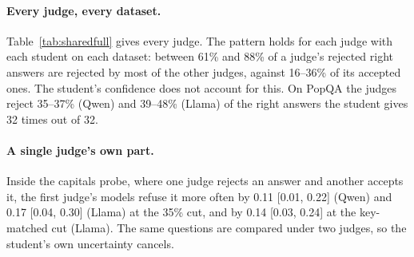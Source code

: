 \begin{table}[t]
\small
\centering
\setlength{\tabcolsep}{3.6pt}
\caption{Each judge at the 35\% cut on the right answers of the untrained student (training questions). \emph{Rej.}: share of right answers the judge rejects. \emph{Shared}: share of its rejections, and of its acceptances, that at least two of the other three judges also reject. \emph{AUC}: how well another judge's score (mean over the other three) and the student's confidence (agreement among its 32 samples) predict the judge's verdict.}
\label{tab:sharedfull}
\end{table}

\paragraph{Every judge, every dataset.} Table~\ref{tab:sharedfull} gives every judge. The pattern holds for each judge with each student on each dataset: between 61\% and 88\% of a judge's rejected right answers are rejected by most of the other judges, against 16--36\% of its accepted ones. The student's confidence does not account for this. On PopQA the judges reject 35--37\% (Qwen) and 39--48\% (Llama) of the right answers the student gives 32 times out of 32.

\paragraph{A single judge's own part.} Inside the capitals probe, where one judge rejects an answer and another accepts it, the first judge's models refuse it more often by 0.11 [0.01, 0.22] (Qwen) and 0.17 [0.04, 0.30] (Llama) at the 35\% cut, and by 0.14 [0.03, 0.24] at the key-matched cut (Llama). The same questions are compared under two judges, so the student's own uncertainty cancels.

